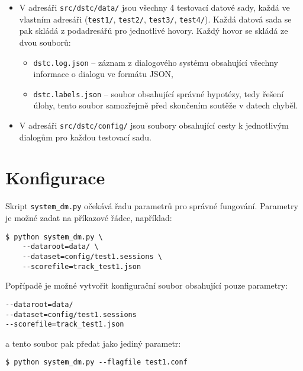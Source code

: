 \begin{itemize}
\item V adresáři \texttt{src/dstc/data/} jsou všechny 4 testovací datové sady, každá ve vlastním adresáři (\texttt{test1/}, \texttt{test2/}, \texttt{test3/}, \texttt{test4/}).
Každá datová sada se pak skládá z podadresářů pro jednotlivé hovory.
Každý hovor se skládá ze dvou souborů:
	\begin{itemize}
	\item \texttt{dstc.log.json} -- záznam z dialogového systému obsahující všechny informace o dialogu ve formátu JSON,
	\item \texttt{dstc.labels.json} -- soubor obsahující správné hypotézy, tedy řešení úlohy, tento soubor samozřejmě před skončením soutěže v datech  chyběl.
	\end{itemize}

\item V adresáři \texttt{src/dstc/config/} jsou soubory obsahující cesty k jednotlivým dialogům pro každou testovací sadu.
\end{itemize}

\section{Konfigurace}

Skript \texttt{system\_dm.py} očekává řadu parametrů pro správné fungování.
Parametry je možné zadat na příkazové řádce, například:
\begin{verbatim}
$ python system_dm.py \
    --dataroot=data/ \
    --dataset=config/test1.sessions \
    --scorefile=track_test1.json
\end{verbatim}

Popřípadě je možné vytvořit konfigurační soubor obsahující pouze parametry:
\begin{verbatim}
--dataroot=data/
--dataset=config/test1.sessions
--scorefile=track_test1.json
\end{verbatim}
a tento soubor pak předat jako jediný parametr:
\begin{verbatim}
$ python system_dm.py --flagfile test1.conf
\end{verbatim}

